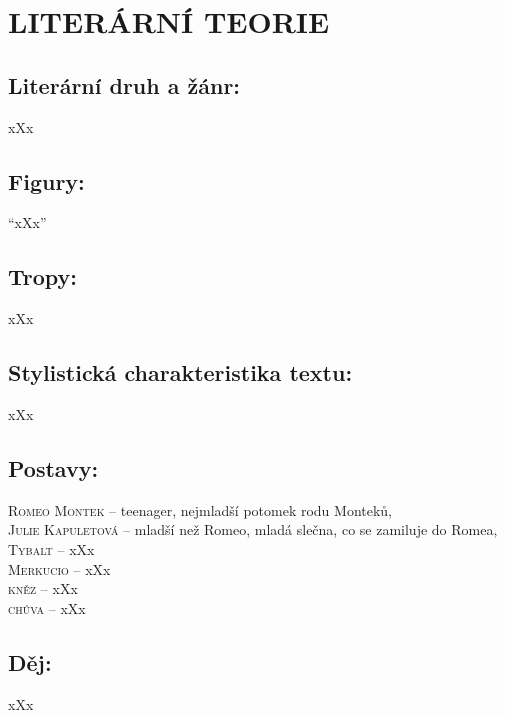 \documentclass[A4paper]{extarticle} %
\begin{document}
\section*{LITERÁRNÍ TEORIE}

\subsection*{Literární druh a žánr:}
\noindent xXx



\subsection*{Figury:}
\noindent 
\enquote{xXx}

\subsection*{Tropy:}
\noindent 
xXx

\subsection*{Stylistická charakteristika textu:}
\noindent 
xXx

\subsection*{Postavy:}
\noindent 
\textsc{Romeo Montek --} teenager, nejmladší potomek rodu Monteků,  \\
\textsc{Julie Kapuletová --} mladší než Romeo, mladá slečna, co se zamiluje do Romea, \\
\textsc{Tybalt --} xXx \\
\textsc{Merkucio --} xXx \\
\textsc{kněz --} xXx \\
\textsc{chůva --} xXx

\subsection*{Děj:}
\noindent 
xXx
\end{document}
